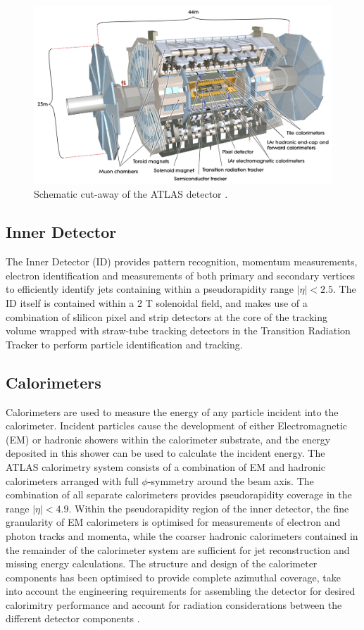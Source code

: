 	\begin{figure}[h]
		\centering
		\includegraphics[width=0.7\linewidth]{D/FIGS/ATLAS_SE_Corrected7}
		\caption{Schematic cut-away of the ATLAS detector \cite{ATLASSchem}.}
		\label{fig:t:ATLAS}
	\end{figure}
	

	
	\subsection{Inner Detector} 
	
		The Inner Detector (ID) provides pattern recognition, momentum measurements, electron identification and measurements of both primary and secondary vertices to efficiently identify jets containing \bhadron within a pseudorapidity range $|\eta|<2.5$. The ID itself is contained within a 2 T solenoidal field, and makes use of a combination of slilicon pixel and strip detectors at the core of the tracking volume wrapped with straw-tube tracking detectors in the Transition Radiation Tracker to perform particle identification and tracking.
		
	\subsection{Calorimeters}
	
		Calorimeters are used to measure the energy of any particle incident into the calorimeter. Incident particles cause the development of either Electromagnetic (EM) or hadronic showers within the calorimeter substrate, and the energy deposited in this shower can be used to calculate the incident energy. The ATLAS calorimetry system consists of a combination of EM and hadronic calorimeters arranged with full $\phi$-symmetry around the beam axis. The combination of all separate calorimeters provides pseudorapidity coverage in the range $|\eta| < 4.9$. Within the pseudorapidity region of the inner detector, the fine granularity of EM calorimeters is optimised for measurements of electron and photon tracks and momenta, while the coarser hadronic calorimeters contained in the remainder of the calorimeter system are sufficient for jet reconstruction and missing energy calculations. The structure and design of the calorimeter components has been optimised to provide complete azimuthal coverage, take into account the engineering requirements for assembling the detector for desired calorimitry performance and account for radiation considerations between the different detector components \cite{ATLAS}.
		
